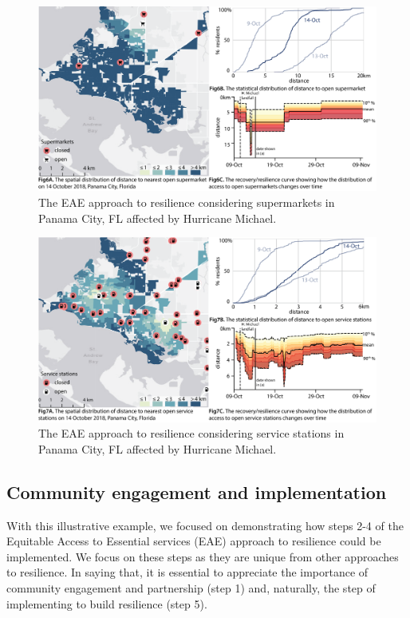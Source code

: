 \documentclass[onecolumn,doublespacing]{risa}
\begin{document}
\begin{figure}
    \centering
    \includegraphics[width=\linewidth]{report/fig/FL_supermarket_resilience.png}
    \caption{The EAE approach to resilience considering supermarkets in Panama City, FL affected by Hurricane Michael.
    }
    \label{fig:FL_resil_super}
\end{figure}
\begin{figure}
    \centering
    \includegraphics[width=\linewidth]{report/fig/FL_gasstation_resilience.png}
    \caption{The EAE approach to resilience considering service stations in Panama City, FL affected by Hurricane Michael.
    }
    \label{fig:FL_resil_gas}
\end{figure}

\subsection{Community engagement and implementation}
With this illustrative example, we focused on demonstrating how steps 2-4 of the Equitable Access to Essential services (EAE) approach to resilience could be implemented. 
We focus on these steps as they are unique from other approaches to resilience.
In saying that, it is essential to appreciate the importance of community engagement and partnership (step 1) and, naturally, the step of implementing to build resilience (step 5).
\end{document}
